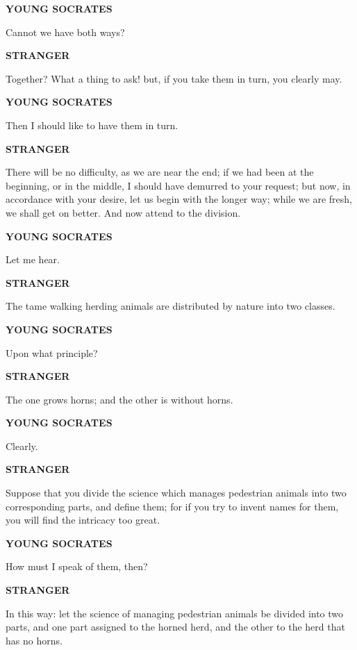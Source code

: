 \documentclass[11pt,letter]{article}
\begin{document}
\par \textbf{YOUNG SOCRATES}
\par   Cannot we have both ways?

\par \textbf{STRANGER}
\par   Together? What a thing to ask! but, if you take them in turn, you clearly may.

\par \textbf{YOUNG SOCRATES}
\par   Then I should like to have them in turn.

\par \textbf{STRANGER}
\par   There will be no difficulty, as we are near the end; if we had been at the beginning, or in the middle, I should have demurred to your request; but now, in accordance with your desire, let us begin with the longer way; while we are fresh, we shall get on better. And now attend to the division.

\par \textbf{YOUNG SOCRATES}
\par   Let me hear.

\par \textbf{STRANGER}
\par   The tame walking herding animals are distributed by nature into two classes.

\par \textbf{YOUNG SOCRATES}
\par   Upon what principle?

\par \textbf{STRANGER}
\par   The one grows horns; and the other is without horns.

\par \textbf{YOUNG SOCRATES}
\par   Clearly.

\par \textbf{STRANGER}
\par   Suppose that you divide the science which manages pedestrian animals into two corresponding parts, and define them; for if you try to invent names for them, you will find the intricacy too great.

\par \textbf{YOUNG SOCRATES}
\par   How must I speak of them, then?

\par \textbf{STRANGER}
\par   In this way:  let the science of managing pedestrian animals be divided into two parts, and one part assigned to the horned herd, and the other to the herd that has no horns.
\end{document}
